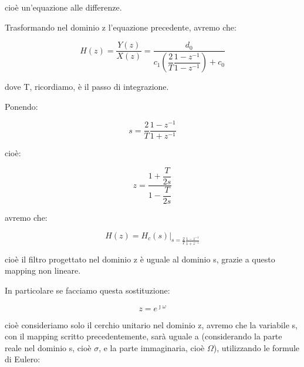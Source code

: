 cioè un'equazione alle differenze. \newline 

Trasformando nel dominio z l'equazione precedente, avremo che: 

{
    \Large 
    \begin{equation}
        H \left(z\right)
        = 
        \dfrac{Y \left(z\right)}{X \left(z\right)}
        = 
        \dfrac{d_0}{c_1 \left(\dfrac{2}{T} \dfrac{1 - z^{-1}}{1 - z^{-1}}\right) + c_0}
    \end{equation}

} 

dove T, ricordiamo, è il passo di integrazione. \newline 

\newpage 

Ponendo: 

{
    \Large 
    \begin{equation}
        s 
        = 
        \dfrac{2}{T} 
        \dfrac{1 - z^{-1}}{1 + z^{-1}}
    \end{equation}
} 

cioè: 

{
    \Large 
    \begin{equation}
    z 
    = 
    \dfrac{1 + \dfrac{T}{2s}}{1 - \dfrac{T}{2s}}        
    \end{equation}
}

avremo che: 

{
    \Large 
    \begin{equation}
    H \left(z \right) 
    = 
    \left.
    H_c \left(s\right) 
    \right|_{s 
        = 
        \frac{2}{T} 
        \frac{1 - z^{-1}}{1 + z^{-1}}}   
    \end{equation}
    
} 

cioè il filtro progettato nel dominio z è uguale al dominio s, grazie a questo mapping non lineare. \newline  

In particolare se facciamo questa sostituzione: 

{
    \Large 
    \begin{equation}
        z = e^{\jmath \omega}
    \end{equation}
}

cioè consideriamo solo il cerchio unitario nel dominio z, 
avremo che la variabile s, con il mapping scritto precedentemente, 
sarà uguale a (considerando la parte reale nel dominio s, cioè $\sigma$, e la parte immaginaria, cioè $\Omega$), utilizzando le formule di Eulero: 

